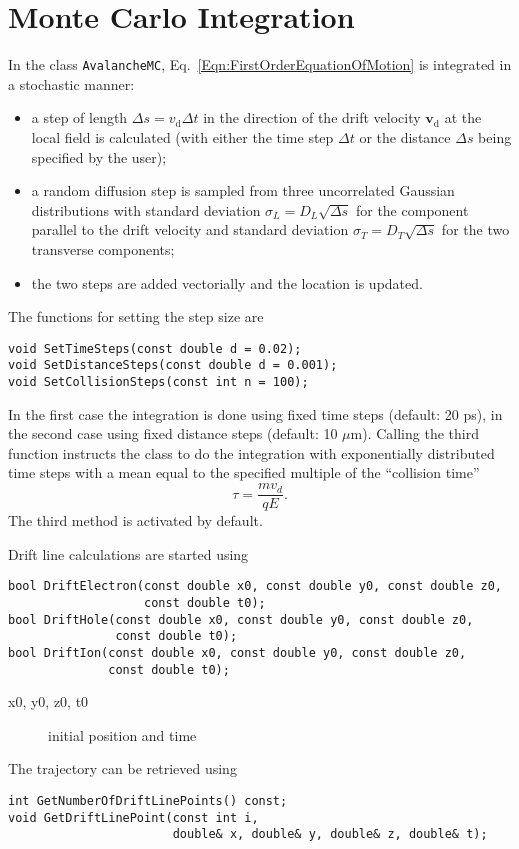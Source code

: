 \section{Monte Carlo Integration}
In the class \texttt{AvalancheMC}, Eq.~\eqref{Eqn:FirstOrderEquationOfMotion}
is integrated in a stochastic manner:
\begin{itemize}
  \item
  a step of length \(\Delta{s} = v_{\text{d}}\Delta{t}\) 
  in the direction of the
  drift velocity \(\mathbf{v}_{\text{d}}\) 
  at the local field is calculated (with either the 
  time step \(\Delta{t}\) or the distance \(\Delta{s}\) 
  being specified by the user);
  \item
   a random diffusion step
   is sampled from three uncorrelated Gaussian distributions
   with standard deviation \(\sigma_{L} = D_{L}\sqrt{\Delta{s}}\)
   for the component parallel to the drift velocity and
   standard deviation
   \(\sigma_{T} = D_{T}\sqrt{\Delta{s}}\) for the two
   transverse components;
   \item
   the two steps are added vectorially and the location is updated.
\end{itemize}
The functions for setting the step size are 
\begin{lstlisting}
void SetTimeSteps(const double d = 0.02);
void SetDistanceSteps(const double d = 0.001);
void SetCollisionSteps(const int n = 100);
\end{lstlisting} 
In the first case the integration is done 
using fixed time steps (default: 20 ps), 
in the second case using fixed distance steps (default: 10 \(\mu\)m). 
Calling the third function instructs the class to 
do the integration with exponentially distributed time steps 
with a mean equal to the specified multiple of the ``collision time'' 
\begin{equation*}
  \tau = \frac{m v_{d}}{q E}.
\end{equation*}
The third method is activated by default.

Drift line calculations are started using 
\begin{lstlisting}
bool DriftElectron(const double x0, const double y0, const double z0,
                   const double t0);
bool DriftHole(const double x0, const double y0, const double z0,
               const double t0);
bool DriftIon(const double x0, const double y0, const double z0,
              const double t0);
\end{lstlisting}
\begin{description}
  \item[x0, y0, z0, t0] initial position and time
\end{description}
The trajectory can be retrieved using
\begin{lstlisting} 
int GetNumberOfDriftLinePoints() const;
void GetDriftLinePoint(const int i,
                       double& x, double& y, double& z, double& t);
\end{lstlisting}

